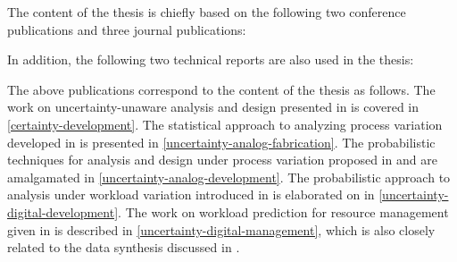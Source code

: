 The content of the thesis is chiefly based on the following two conference
publications and three journal publications:

\printbibliography[heading=none,keyword=own]

In addition, the following two technical reports are also used in the thesis:

\printbibliography[heading=none,keyword=own-unpublished]

The above publications correspond to the content of the thesis as follows. The
work on uncertainty-unaware analysis and design presented in \cite{ukhov2012} is
covered in \cref{certainty-development}. The statistical approach to analyzing
process variation developed in \cite{ukhov2014a} is presented in
\cref{uncertainty-analog-fabrication}. The probabilistic techniques for analysis
and design under process variation proposed in \cite{ukhov2014b} and
\cite{ukhov2015} are amalgamated in \cref{uncertainty-analog-development}. The
probabilistic approach to analysis under workload variation introduced in
\cite{ukhov2017a} is elaborated on in \cref{uncertainty-digital-development}.
The work on workload prediction for resource management given in
\cite{ukhov2017b} is described in \cref{uncertainty-digital-management}, which
is also closely related to the data synthesis discussed in \cite{ukhov2017c}.
